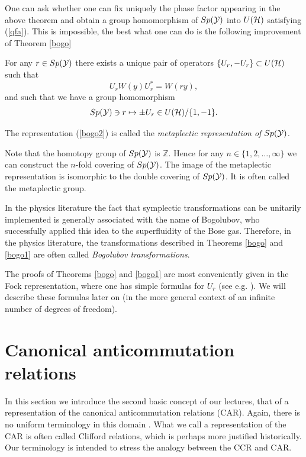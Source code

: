 \documentclass{svmult}
\newcommand{\beq}{\begin{equation}}
\newcommand{\eeq}{\end{equation}}
\def\bet{\begin{theorem}}
\def\eet{\end{theorem}}
\def\zz{{\mathbb Z}}
\def\cY{{\cal Y}}
\def\cH{{\cal H}}
\def\cH{{\cal H}}
\begin{document}
One can ask whether one can 
fix uniquely the phase factor appearing  in the above theorem
and obtain
a group homomorphism of $Sp(\cY)$ into $U(\cH)$ satisfying (\ref{qfa}). 
This is impossible, the best what one can do is
the following improvement of Theorem \ref{bogo}
\bet For any $r\in Sp(\cY)$ there exists a unique pair of operators
$\{U_r,-U_r\}\subset U(\cH)$ such that
\[U_r W(y)U_r^*=W(ry),\]
and such that we have a group homomorphism
\beq Sp(\cY)\ni r\mapsto \pm U_r\in  U(\cH)/\{1,-1\}.\label{bogo2}\eeq
\label{bogo1}\eet

The representation  (\ref{bogo2}) is called the {\em metaplectic representation
of $Sp(\cY)$.}


 Note that the
homotopy group of $Sp(\cY)$ is $\zz$. Hence for any 
$n\in\{1,2,\dots,\infty\}$ we can construct the $n$-fold covering of
$Sp(\cY)$. The image of the metaplectic representation is isomorphic to the
double covering of $Sp(\cY)$.  It is often called the metaplectic group.


In the physics literature the fact that symplectic transformations can be
unitarily implemented is generally associated with the name of Bogolubov, who
successfully applied this idea to
the superfluidity of the Bose gas.
 Therefore, in the physics literature, the transformations
described in Theorems \ref{bogo} and \ref{bogo1} are often called
 {\em  Bogolubov transformations}.

The proofs of Theorems \ref{bogo} and \ref{bogo1} are most conveniently given
in the Fock representation, where one has simple formulas for $U_r$
 (see e.g. \cite{Fol,Ber}). 
We will describe these formulas later on (in the more general context of an
infinite number of degrees of freedom).







\section{Canonical anticommutation relations}

In this section we introduce the second basic concept of our lectures, that of
a representation of the canonical anticommutation relations  (CAR). Again, there is no uniform terminology in this
domain \cite{Em,BR2,BSZ}. What we call a representation of the CAR is often called 
 Clifford relations, which is perhaps more justified
 historically. Our terminology is intended to stress the analogy between the 
CCR
 and CAR.
\end{document}
